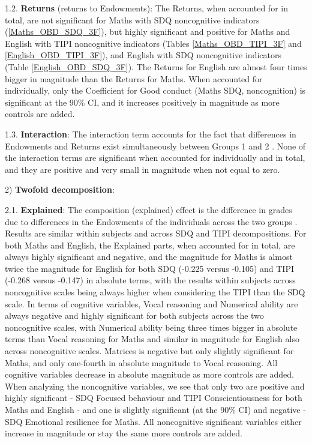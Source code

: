 \documentclass[12pt,a4paper,onecolumn]{article}
\numberwithin{equation}{section}
\begin{document}
1.2. \textbf{Returns} (returns to Endowments): The Returns, when accounted for in total, are not significant for Maths with SDQ noncognitive indicators (\ref{Maths_OBD_SDQ_3F}), but highly significant and positive for Maths and English with TIPI noncognitive indicators (Tables \ref{Maths_OBD_TIPI_3F} and \ref{English_OBD_TIPI_3F}), and English with SDQ noncognitive indicators (Table \ref{English_OBD_SDQ_3F}). The Returns for English are almost four times bigger in magnitude than the Returns for Maths. When accounted for individually, only the Coefficient for Good conduct (Maths SDQ, noncognition) is significant at the 90\% CI, and it increases positively in magnitude as more controls are added.

1.3. \textbf{Interaction}: The interaction term accounts for the fact that differences in Endowments and Returns exist simultaneously between Groups 1 and 2 \parencite{jann2008}. None of the interaction terms are significant when accounted for individually and in total, and they are positive and very small in magnitude when not equal to zero.

2) \textbf{Twofold decomposition}: 

2.1. \textbf{Explained}: The composition (explained) effect is the difference in grades due to differences in the Endowments of the individuals across the two groups \parencite{popli2013}. Results are similar within subjects and across SDQ and TIPI decompositions. For both Maths and English, the Explained parts, when accounted for in total, are always highly significant and negative, and the magnitude for Maths is almost twice the magnitude for English for both SDQ (-0.225 versus -0.105) and TIPI (-0.268 versus -0.147) in absolute terms, with the results within subjects across noncognitive scales being always higher when considering the TIPI than the SDQ scale. In terms of cognitive variables, Vocal reasoning and Numerical ability are always negative and highly significant for both subjects across the two noncognitive scales, with Numerical ability being three times bigger in absolute terms than Vocal reasoning for Maths and similar in magnitude for English also across noncognitive scales. Matrices is negative but only slightly significant for Maths, and only one-fourth in absolute magnitude to Vocal reasoning. All cognitive variables decrease in absolute magnitude as more controls are added. When analyzing the noncognitive variables, we see that only two are positive and highly significant - SDQ Focused behaviour and TIPI Conscientiousness for both Maths and English - and one is slightly significant (at the 90\% CI) and negative - SDQ Emotional resilience for Maths. All noncognitive significant variables either increase in magnitude or stay the same more controls are added. 
\end{document}

